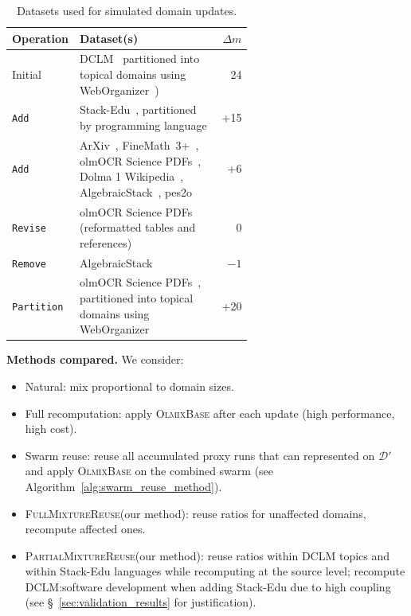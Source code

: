 \documentclass[table]{ai2style/ai2}
\newcommand{\D}[0]{\mathcal{D}}
\newcommand{\base}[0]{\textsc{OlmixBase}\xspace}
\newcommand{\fullmixreuse}[0]{\textsc{FullMixtureReuse}\xspace}
\newcommand{\partialmixreuse}[0]{\textsc{PartialMixtureReuse}\xspace}
\newcommand{\Add}[0]{\texttt{Add}\xspace}
\newcommand{\Remove}[0]{\texttt{Remove}\xspace}
\newcommand{\Partition}[0]{\texttt{Partition}\xspace}
\newcommand{\Revise}[0]{\texttt{Revise}\xspace}
\begin{document}
\begin{table}[!h]
\centering
\caption{Datasets used for simulated domain updates.}
\small
\begin{tabular}{l p{0.6\linewidth} r}
\toprule
\textbf{Operation} & \textbf{Dataset(s)} & \textbf{$\Delta m$} \\
\midrule
Initial &
DCLM~\citep{dclm} partitioned into topical domains using WebOrganizer~\citep{wettig2025organizewebconstructingdomains}) &
24 \\
\midrule
\Add &
Stack-Edu~\citep{allal2025smollm2smolgoesbig}, partitioned by programming language &
+15 \\
\Add &
ArXiv~\citep{azerbayev2023llemma}, FineMath~3+~\citep{allal2025smollm2smolgoesbig}, olmOCR Science PDFs~\citep{olmo2025olmo3}, Dolma 1 Wikipedia~\citep{soldaini2024dolma}, AlgebraicStack~\citep{azerbayev2023llemma}, pes2o~\citep{peS2o} &
+6 \\
\Revise &
olmOCR Science PDFs~\citep{olmo2025olmo3} (reformatted tables and references) &
0 \\
\Remove &
AlgebraicStack~\citep{azerbayev2023llemma} &
$-1$ \\
\Partition &
olmOCR Science PDFs~\citep{olmo2025olmo3}, partitioned into topical domains using WebOrganizer~\citep{wettig2025organizewebconstructingdomains} &
+20 \\
\bottomrule
\end{tabular}
\label{tab:domain-updates-full}
\end{table}

\textbf{Methods compared.} We consider:
\begin{itemize}[itemsep=0pt,topsep=0pt,leftmargin=12pt]
    \item Natural: mix proportional to domain sizes.
    \item Full recomputation: apply \base after each update (high performance, high cost).
    \item Swarm reuse: reuse all accumulated proxy runs that can represented on $\D'$ and apply \base on the combined swarm (see Algorithm~\ref{alg:swarm_reuse_method}). 
    \item \fullmixreuse (our method): reuse ratios for unaffected domains, recompute affected ones. 
    \item \partialmixreuse (our method): reuse ratios within DCLM topics and within Stack-Edu languages while recomputing at the source level; recompute DCLM:software development when adding Stack-Edu due to high coupling (see \S~\ref{sec:validation_results} for justification).
\end{itemize}
\end{document}
